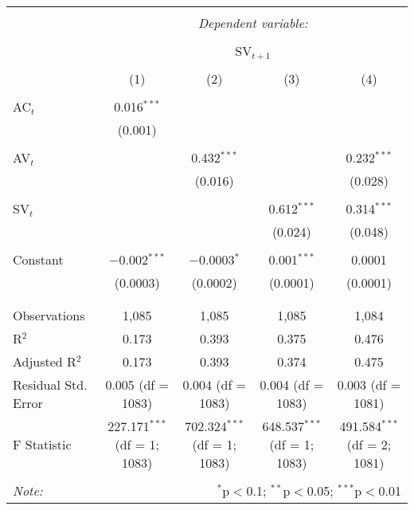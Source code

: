 
\begin{table}[!htbp] \centering 
  \caption{} 
  \label{} 
\begin{tabular}{@{\extracolsep{5pt}}lcccc} 
\\[-1.8ex]\hline 
\hline \\[-1.8ex] 
 & \multicolumn{4}{c}{\textit{Dependent variable:}} \\ 
\cline{2-5} 
\\[-1.8ex] & \multicolumn{4}{c}{SV$_{t+1}$} \\ 
\\[-1.8ex] & (1) & (2) & (3) & (4)\\ 
\hline \\[-1.8ex] 
 AC$_{t}$ & 0.016$^{***}$ &  &  &  \\ 
  & (0.001) &  &  &  \\ 
  & & & & \\ 
 AV$_{t}$ &  & 0.432$^{***}$ &  & 0.232$^{***}$ \\ 
  &  & (0.016) &  & (0.028) \\ 
  & & & & \\ 
 SV$_{t}$ &  &  & 0.612$^{***}$ & 0.314$^{***}$ \\ 
  &  &  & (0.024) & (0.048) \\ 
  & & & & \\ 
 Constant & $-$0.002$^{***}$ & $-$0.0003$^{*}$ & 0.001$^{***}$ & 0.0001 \\ 
  & (0.0003) & (0.0002) & (0.0001) & (0.0001) \\ 
  & & & & \\ 
\hline \\[-1.8ex] 
Observations & 1,085 & 1,085 & 1,085 & 1,084 \\ 
R$^{2}$ & 0.173 & 0.393 & 0.375 & 0.476 \\ 
Adjusted R$^{2}$ & 0.173 & 0.393 & 0.374 & 0.475 \\ 
Residual Std. Error & 0.005 (df = 1083) & 0.004 (df = 1083) & 0.004 (df = 1083) & 0.003 (df = 1081) \\ 
F Statistic & 227.171$^{***}$ (df = 1; 1083) & 702.324$^{***}$ (df = 1; 1083) & 648.537$^{***}$ (df = 1; 1083) & 491.584$^{***}$ (df = 2; 1081) \\ 
\hline 
\hline \\[-1.8ex] 
\textit{Note:}  & \multicolumn{4}{r}{$^{*}$p$<$0.1; $^{**}$p$<$0.05; $^{***}$p$<$0.01} \\ 
\end{tabular} 
\end{table} 
